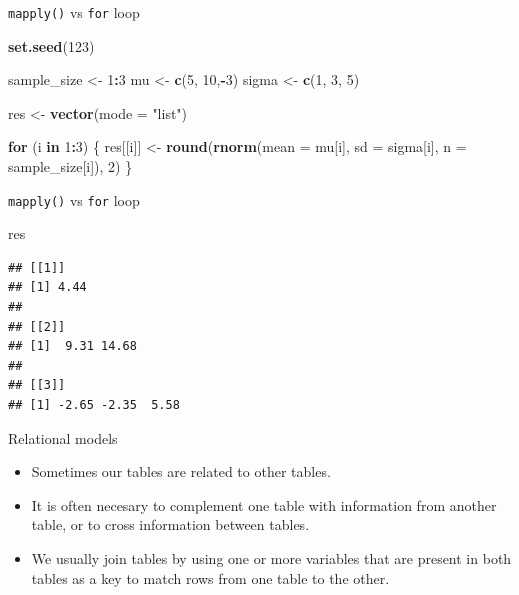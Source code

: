 \documentclass[ignorenonframetext,]{beamer}
\newenvironment{Shaded}{\begin{snugshade}}{\end{snugshade}}
\newcommand{\ControlFlowTok}[1]{\textcolor[rgb]{0.13,0.29,0.53}{\textbf{#1}}}
\newcommand{\DataTypeTok}[1]{\textcolor[rgb]{0.13,0.29,0.53}{#1}}
\newcommand{\DecValTok}[1]{\textcolor[rgb]{0.00,0.00,0.81}{#1}}
\newcommand{\KeywordTok}[1]{\textcolor[rgb]{0.13,0.29,0.53}{\textbf{#1}}}
\newcommand{\NormalTok}[1]{#1}
\newcommand{\OperatorTok}[1]{\textcolor[rgb]{0.81,0.36,0.00}{\textbf{#1}}}
\newcommand{\StringTok}[1]{\textcolor[rgb]{0.31,0.60,0.02}{#1}}
\begin{document}
\begin{frame}[fragile]{\texttt{mapply()} vs \texttt{for} loop}
\protect\hypertarget{mapply-vs-for-loop}{}

\begin{Shaded}
\begin{Highlighting}[]
\KeywordTok{set.seed}\NormalTok{(}\DecValTok{123}\NormalTok{)}

\NormalTok{sample_size <-}\StringTok{ }\DecValTok{1}\OperatorTok{:}\DecValTok{3}
\NormalTok{mu <-}\StringTok{ }\KeywordTok{c}\NormalTok{(}\DecValTok{5}\NormalTok{, }\DecValTok{10}\NormalTok{,}\OperatorTok{-}\DecValTok{3}\NormalTok{)}
\NormalTok{sigma <-}\StringTok{ }\KeywordTok{c}\NormalTok{(}\DecValTok{1}\NormalTok{, }\DecValTok{3}\NormalTok{, }\DecValTok{5}\NormalTok{)}

\NormalTok{res <-}\StringTok{ }\KeywordTok{vector}\NormalTok{(}\DataTypeTok{mode =} \StringTok{"list"}\NormalTok{)}

\ControlFlowTok{for}\NormalTok{ (i }\ControlFlowTok{in} \DecValTok{1}\OperatorTok{:}\DecValTok{3}\NormalTok{) \{}
\NormalTok{  res[[i]] <-}\StringTok{ }\KeywordTok{round}\NormalTok{(}\KeywordTok{rnorm}\NormalTok{(}\DataTypeTok{mean =}\NormalTok{ mu[i],}
                          \DataTypeTok{sd =}\NormalTok{ sigma[i],}
                          \DataTypeTok{n =}\NormalTok{ sample_size[i]),}
                    \DecValTok{2}\NormalTok{)}
\NormalTok{\}}
\end{Highlighting}
\end{Shaded}

\end{frame}

\begin{frame}[fragile]{\texttt{mapply()} vs \texttt{for} loop}
\protect\hypertarget{mapply-vs-for-loop-1}{}

\begin{Shaded}
\begin{Highlighting}[]
\NormalTok{res}
\end{Highlighting}
\end{Shaded}

\begin{verbatim}
## [[1]]
## [1] 4.44
## 
## [[2]]
## [1]  9.31 14.68
## 
## [[3]]
## [1] -2.65 -2.35  5.58
\end{verbatim}

\end{frame}

\begin{frame}{Relational models}
\protect\hypertarget{relational-models}{}

\begin{itemize}
\item
  Sometimes our tables are related to other tables.
\item
  It is often necesary to complement one table with information from
  another table, or to cross information between tables.
\item
  We usually join tables by using one or more variables that are present
  in both tables as a key to match rows from one table to the other.
\end{itemize}

\end{frame}
\end{document}
